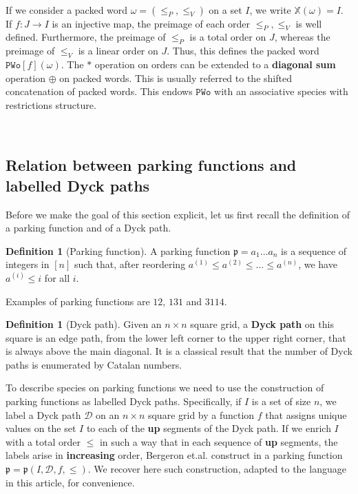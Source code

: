 \documentclass[12pt, reqno]{amsart}
\theoremstyle{definition}
\newtheorem{defin}[thm]{Definition}
\begin{document}
\

\label{defin:pwo}
If we consider a packed word $\omega = (\leq_P, \leq_V) $ on a set $I$, we write $\mathbb{X}(\omega) = I$.
If $f:J \to I $ is an injective map, the preimage of each order $\leq_P, \leq_V$ is well defined.
Furthermore, the preimage of $\leq_P$ is a total order on $J$, whereas the preimage of $\leq_V$ is a linear order on $J$.
Thus, this defines the packed word $\mathtt{PWo}[f](\omega )$.
The $\ast $ operation on orders can be extended to a \textbf{diagonal sum} operation $\oplus $ on packed words.
This is usually referred to the shifted concatenation of packed words.
This endows $\mathtt{PWo}$ with an  associative species with restrictions structure.

\

\subsection{Relation between parking functions and labelled Dyck paths}

Before we make the goal of this section explicit, let us first recall the definition of a parking function and of a Dyck path.

\begin{defin}[Parking function]
A parking function $\mathfrak{p} = a_1 \dots a_n$ is a sequence of integers in $[n]$ such that, after reordering $a^{(1)} \leq a^{(2)} \leq \dots \leq a^{(n)}$, we have $a^{(i)} \leq i$ for all $i$.
\end{defin}

Examples of parking functions are $12$, $131$ and $3114$.

\begin{defin}[Dyck path]
Given an $n\times n$ square grid, a \textbf{Dyck path} on this square is an edge path, from the lower left corner to the upper right corner, that is always above the main diagonal.
It is a classical result that the number of Dyck paths is enumerated by Catalan numbers.
\end{defin}


To describe species on parking functions we need to use the construction of parking functions as labelled Dyck paths.
Specifically, if $I$ is a set of size $n$, we label a Dyck path $\mathcal D$ on an $n\times n$ square grid by a function $f$ that assigns unique values on the set $I$ to each of the \textbf{up} segments of the Dyck path.
If we enrich $I$ with a total order $\leq$ in such a way that in each sequence of \textbf{up} segments, the labels arise in \textbf{increasing} order, Bergeron et.al. construct in \cite{BGLPV2021} a parking function $\mathfrak{p} = \mathfrak{p}(I, \mathcal D, f, \leq) $.
We recover here such construction, adapted to the language in this article, for convenience.
\end{document}
